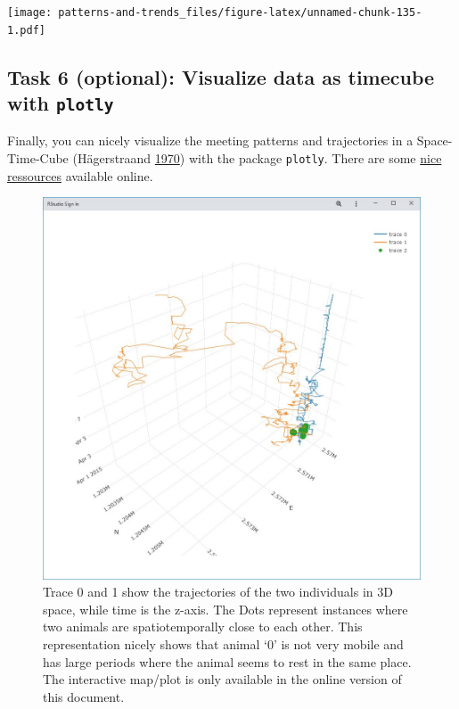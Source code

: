 \documentclass[]{book}
\begin{document}
\texttt{[image: patterns-and-trends\_files/figure-latex/unnamed-chunk-135-1.pdf]}

\hypertarget{task-6-optional-visualize-data-as-timecube-with-plotly}{%
\subsection{\texorpdfstring{Task 6 (optional): Visualize data as timecube with \texttt{plotly}}{Task 6 (optional): Visualize data as timecube with plotly}}\label{task-6-optional-visualize-data-as-timecube-with-plotly}}

Finally, you can nicely visualize the meeting patterns and trajectories in a Space-Time-Cube (Hägerstraand \protect\hyperlink{ref-hagerstraand1970}{1970}) with the package \texttt{plotly}. There are some \href{https://plot.ly/r/3d-line-plots/}{nice ressources} available online.

\begin{figure}
\centering
\includegraphics{02_Images/w04_ex1_p1.jpg}
\caption{Trace 0 and 1 show the trajectories of the two individuals in 3D space, while time is the z-axis. The Dots represent instances where two animals are spatiotemporally close to each other. This representation nicely shows that animal `0' is not very mobile and has large periods where the animal seems to rest in the same place. The interactive map/plot is only available in the online version of this document.}
\end{figure}
\end{document}
